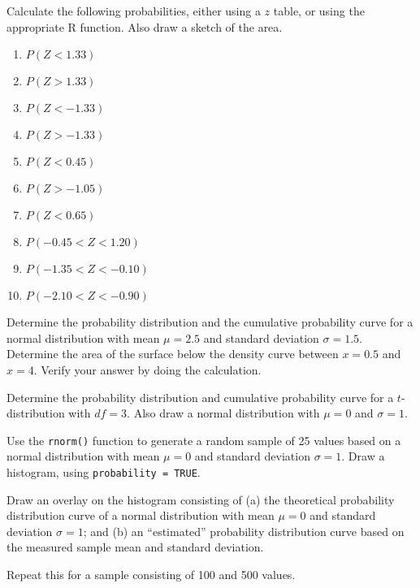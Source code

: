 \begin{exercise}
  \label{ex:prob-norm-dist}
  Calculate the following probabilities, either using a $z$ table, or using the appropriate R function. Also draw a sketch of the area.
  \begin{enumerate}[label=\alph*.]
    \item $P(Z < 1.33)$
    \item $P(Z > 1.33)$
    \item $P(Z < -1.33)$
    \item $P(Z > -1.33)$
    \item $P(Z < 0.45)$
    \item $P(Z > -1.05)$
    \item $P(Z < 0.65)$
    \item $P(-0.45 < Z < 1.20)$
    \item $P(-1.35 < Z < -0.10)$
    \item $P(-2.10 < Z < -0.90)$
  \end{enumerate}
\end{exercise}

\begin{exercise}
  Determine the probability distribution and the cumulative probability curve for a normal distribution with mean $\mu = 2.5$ and standard deviation $\sigma = 1.5$.
  Determine the area of the surface below the density curve between $ x = 0.5 $ and $ x = 4 $.
  Verify your answer by doing the calculation.
\end{exercise}

\begin{exercise}
  Determine the probability distribution and cumulative probability curve for a $t$-distribution with $df = 3$.
  Also draw a normal distribution with $\mu = 0$ and $\sigma = 1$.
\end{exercise}

\begin{exercise}
  Use the \verb|rnorm()| function to generate a random sample of 25 values based on a normal distribution with mean $\mu = 0$ and standard deviation $\sigma = 1$.
  Draw a histogram, using \verb|probability = TRUE|.

  Draw an overlay on the histogram consisting of (a) the theoretical probability distribution curve of a normal distribution with mean $\mu = 0$ and standard deviation $\sigma = 1$;
  and (b) an ``estimated'' probability distribution curve based on the measured sample mean and standard deviation.

  Repeat this for a sample consisting of 100 and 500 values.
\end{exercise}

